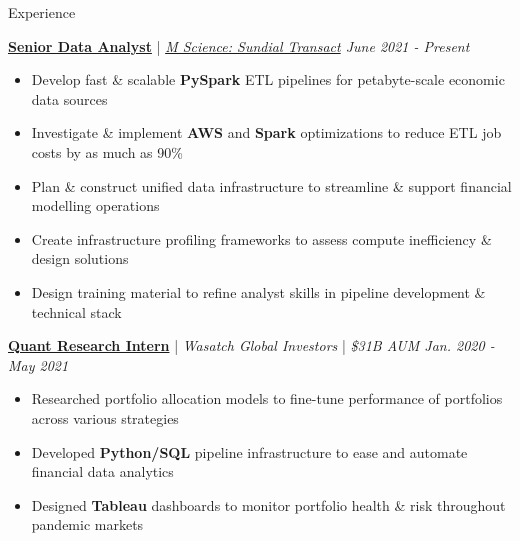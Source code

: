 \documentclass{resume/resume}
\begin{document}
\begin{rSection}{Experience}

  \href{https://mscience.com/}{\bf Senior Data Analyst} | {\em \href{https://sundialdata.com}{M Science: Sundial Transact} \hfill June 2021 - Present}
  \vspace{-6pt}
  \begin{itemize}[nosep]
    \item Develop fast \& scalable {\bf PySpark} ETL pipelines for petabyte-scale economic data sources
    \item Investigate \& implement {\bf AWS} and {\bf Spark} optimizations to reduce ETL job costs by as much as 90\%
    \item Plan \& construct unified data infrastructure to streamline \& support financial modelling operations
    \item Create infrastructure profiling frameworks to assess compute inefficiency \& design solutions
    \item Design training material to refine analyst skills in pipeline development \& technical stack
  \end{itemize}

  \href{https://wasatchglobal.com/}{\bf Quant Research Intern} | {\em Wasatch Global Investors} | {\em \$31B AUM \hfill Jan. 2020 - May 2021}
  \vspace{-6pt}
  \begin{itemize}[nosep]
    \item Researched portfolio allocation models to fine-tune performance of portfolios across various strategies
    \item Developed {\bf Python/SQL} pipeline infrastructure to ease and automate financial data analytics
    \item Designed {\bf Tableau} dashboards to monitor portfolio health \& risk throughout pandemic markets
  \end{itemize}


\end{rSection}
\end{document}
